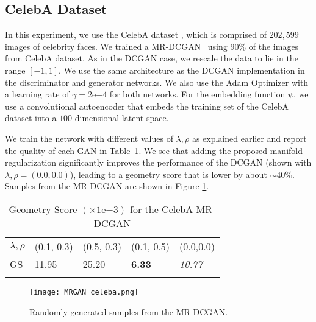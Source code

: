 \documentclass[10pt,twocolumn,letterpaper]{article}
\begin{document}
\vspace{-0.1in}
\subsection{CelebA Dataset}
In this experiment, we use the CelebA dataset \cite{liu2015faceattributes}, which is comprised of $202,599$ images of celebrity faces. We trained a MR-DCGAN~\cite{radford2015unsupervised} using $90\%$ of the images from CelebA dataset. As in the DCGAN case, we rescale the data to lie in the range $[-1,1]$. We use the same architecture as the DCGAN implementation in the discriminator and generator networks. We also use the Adam Optimizer with a learning rate of $\gamma = 2\mathrm{e}{-4}$ for both networks. For the embedding function $\psi$, we use a convolutional autoencoder that embeds the training set of the CelebA dataset into a $100$ dimensional latent space.  

 We train the network with different values of $\lambda, \rho$ as explained earlier and report the quality of each GAN in Table~\ref{tab:dcgan}. We see that adding the proposed manifold regularization significantly improves the performance of the DCGAN (shown with $\lambda,\rho = (0.0, 0.0)$), leading to a geometry score that is lower by about $\sim 40\%$. Samples from the MR-DCGAN are shown in Figure \ref{fig:celeba_results}.

\begin{table}[h]
\centering
\caption{Geometry Score $(\times 1\mathrm{e}{-3})$ for the CelebA MR-DCGAN}
\begin{tabular}{p{1.3cm}p{1.3cm}p{1.3cm}p{1.3cm}p{1.3cm}}
\hline
$\lambda,\rho$ & (0.1, 0.3) & (0.5, 0.3) & (0.1, 0.5)  & (0.0,0.0) \\
GS &11.95 &25.20 &  \textbf{6.33} & {\textit{10.77}} \\\hline
\label{tab:dcgan}
\end{tabular}
\end{table}
\begin{figure}
    \centering
    \texttt{[image: MRGAN\_celeba.png]}
    \caption{\small{Randomly generated samples from the MR-DCGAN.}}
    \label{fig:celeba_results}
\end{figure}

\vspace{-0.1in}
\end{document}
